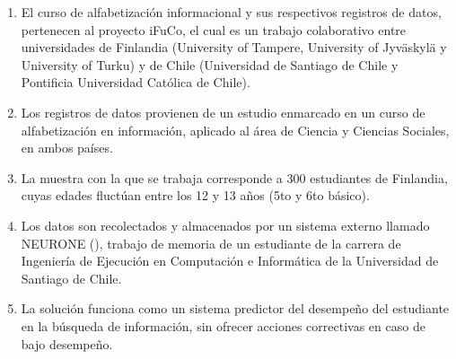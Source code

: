 \begin{enumerate}
	\item El curso de alfabetización informacional y sus respectivos registros de datos, pertenecen al proyecto iFuCo, el cual es un trabajo colaborativo entre universidades de Finlandia (University of Tampere, University of Jyväskylä y University of Turku) y de Chile (Universidad de Santiago de Chile y Pontificia Universidad Católica de Chile). 
	\item Los registros de datos provienen de un estudio enmarcado en un curso de alfabetización en información, aplicado al área de Ciencia y Ciencias Sociales, en ambos países.
	\item La muestra con la que se trabaja corresponde a 300 estudiantes de Finlandia, cuyas edades fluctúan entre los 12 y 13 años (5to y 6to básico).
	\item Los datos son recolectados y almacenados por un sistema externo llamado NEURONE (), trabajo de memoria de un estudiante de la carrera de Ingeniería de Ejecución en Computación e Informática de la Universidad de Santiago de Chile.
	\item La solución funciona como un sistema predictor del desempeño del estudiante en la búsqueda de información, sin ofrecer acciones correctivas en caso de bajo desempeño.
\end{enumerate}
